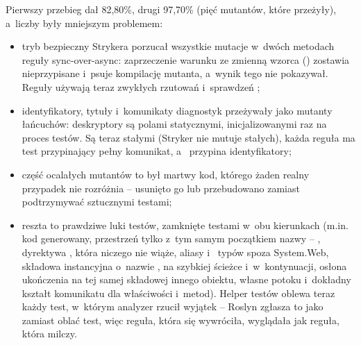 Pierwszy przebieg dał 82,80\%, drugi 97,70\% (pięć mutantów, które przeżyły), a~liczby były
mniejszym problemem:
\begin{itemize}[leftmargin=*]
  \item tryb bezpieczny Strykera porzucał wszystkie mutacje w~dwóch metodach reguły
        sync-over-async: zaprzeczenie warunku ze zmienną wzorca ()
        zostawia  nieprzypisane i~psuje kompilację mutanta, a~wynik tego nie
        pokazywał. Reguły używają teraz zwykłych rzutowań i~sprawdzeń ;
  \item identyfikatory, tytuły i~komunikaty diagnostyk przeżywały jako mutanty łańcuchów:
        deskryptory są polami statycznymi, inicjalizowanymi raz na proces testów. Są teraz
        stałymi (Stryker nie mutuje stałych), każda reguła ma test przypinający pełny
        komunikat, a~ przypina identyfikatory;
  \item część ocalałych mutantów to był martwy kod, którego żaden realny przypadek nie
        rozróżnia -- usunięto go lub przebudowano zamiast podtrzymywać sztucznymi testami;
  \item reszta to prawdziwe luki testów, zamknięte testami w~obu kierunkach (m.in. kod
        generowany, przestrzeń tylko z~tym samym początkiem nazwy -- ,
        dyrektywa , która niczego nie wiąże, aliasy i~
        typów spoza System.Web, składowa instancyjna o~nazwie ,
         na szybkiej ścieżce i~w~kontynuacji, osłona ukończenia
        na tej samej składowej innego obiektu, własne  potoku
        i~dokładny kształt komunikatu dla właściwości i~metod). Helper testów oblewa
        teraz każdy test, w~którym analyzer rzucił wyjątek -- Roslyn zgłasza to jako
         zamiast oblać test, więc reguła, która się wywróciła, wyglądała
        jak reguła, która milczy.
\end{itemize}

